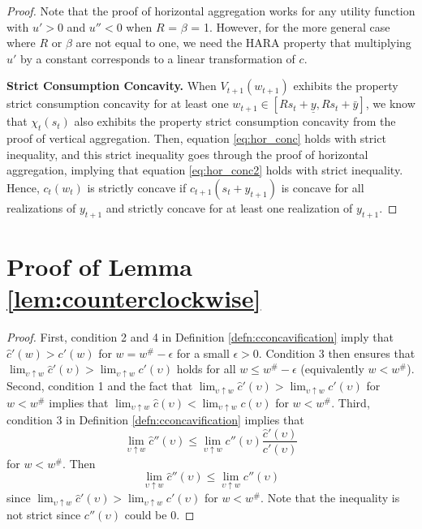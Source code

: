 \documentclass[titlepage]{\econtex}
\begin{document}
\begin{proof}
    Note that the proof of horizontal aggregation works for any utility function with $u' > 0$ and $u'' < 0$ when $R$ = $\beta$ = 1. However, for the more general case where $R$ or $\beta$ are not equal to one, we need the HARA property that multiplying $u'$ by a constant corresponds to a linear transformation of $c$. 
    
    \bigskip
    \noindent \textbf{Strict Consumption Concavity.}
    When $V_{t+1}(w_{t+1})$ exhibits the property strict consumption concavity for at least one $w_{t+1} \in [Rs_t + \underline{y}, Rs_t + \bar{y}]$, we know that $\chi_t(s_t)$ also exhibits the property strict consumption concavity from the proof of vertical aggregation. Then, equation \eqref{eq:hor_conc} holds with strict inequality, and this strict inequality goes through the proof of horizontal aggregation, implying that equation \eqref{eq:hor_conc2} holds with strict inequality. Hence, $c_t(w_t)$ is strictly concave if $c_{t+1}(s_t + {y}_{t+1})$ is concave for all realizations of ${y}_{t+1}$ and strictly concave for at least one realization of ${y}_{t+1}$. 
  \end{proof}


  \section{Proof of Lemma \ref{lem:counterclockwise}} \label{app:counterclockwise}
  \begin{proof} First, condition 2 and 4 in Definition \ref{defn:cconcavification} imply that $\hat{c}'(w) > c'(w)$ for $w = w^{\#} - \epsilon$ for a small $\epsilon > 0$. Condition 3 then ensures that $\lim_{\upsilon \uparrow w} \hat{c}'(\upsilon) > \lim_{\upsilon \uparrow w} c'(\upsilon)$ holds for all $w \leq w^{\#}-\epsilon$ (equivalently $w < w^{\#}$). Second, condition 1 and the fact that $\lim_{\upsilon \uparrow w} \hat{c}'(\upsilon) > \lim_{\upsilon \uparrow w} c'(\upsilon)$ for $w < w^{\#}$ implies that $\lim_{\upsilon \uparrow w} \hat{c}(\upsilon) < \lim_{\upsilon \uparrow w}c(\upsilon)$ for $w < w^{\#}$. Third, condition 3 in Definition \ref{defn:cconcavification} implies that $$\lim_{\upsilon \uparrow w}\hat{c}''(\upsilon) \leq \lim_{\upsilon \uparrow w} c''(\upsilon)\frac{\hat{c}'(\upsilon)}{c'(\upsilon)}$$ for $w < w^{\#}$. Then $$\lim_{\upsilon \uparrow w} \hat{c}''(\upsilon) \leq \lim_{\upsilon \uparrow w} c''(\upsilon)$$ since $\lim_{\upsilon \uparrow w}\hat{c}'(\upsilon) > \lim_{\upsilon \uparrow w} c'(\upsilon)$ for $w < w^{\#}$. Note that the inequality is not strict since $c''(\upsilon)$ could be 0.  
  \end{proof}
\end{document}
